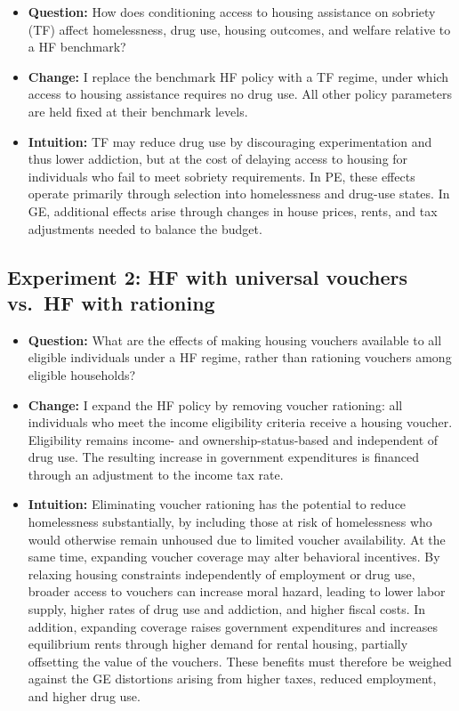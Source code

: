 \documentclass[parskip=full]{article}
\theoremstyle{plain}
\theoremstyle{definition}
\theoremstyle{remark}
\begin{document}
\begin{itemize}
\item \textbf{Question:} How does conditioning access to housing assistance on sobriety (TF) affect homelessness, drug use, housing outcomes, and welfare relative to a HF benchmark?

\item \textbf{Change:} I replace the benchmark HF policy with a TF regime, under which access to housing assistance requires no drug use. All other policy parameters are held fixed at their benchmark levels.

\item \textbf{Intuition:} TF may reduce drug use by discouraging experimentation and thus lower addiction, but at the cost of delaying access to housing for individuals who fail to meet sobriety requirements. In PE, these effects operate primarily through selection into homelessness and drug-use states. In GE, additional effects arise through changes in house prices, rents, and tax adjustments needed to balance the budget.
\end{itemize}

\subsection{Experiment 2: HF with universal vouchers vs.\ HF with rationing}

\begin{itemize}
\item \textbf{Question:} What are the effects of making housing vouchers available to all eligible individuals under a HF regime, rather than rationing vouchers among eligible households?

\item \textbf{Change:} I expand the HF policy by removing voucher rationing: all individuals who meet the income eligibility criteria receive a housing voucher. Eligibility remains income- and ownership-status-based and independent of drug use. The resulting increase in government expenditures is financed through an adjustment to the income tax rate.

\item \textbf{Intuition:} Eliminating voucher rationing has the potential to reduce homelessness substantially, by including those at risk of homelessness who would otherwise remain unhoused due to limited voucher availability. At the same time, expanding voucher coverage may alter behavioral incentives. By relaxing housing constraints independently of employment or drug use, broader access to vouchers can increase moral hazard, leading to lower labor supply, higher rates of drug use and addiction, and higher fiscal costs. In addition, expanding coverage raises government expenditures and increases equilibrium rents through higher demand for rental housing, partially offsetting the value of the vouchers. These benefits must therefore be weighed against the GE distortions arising from higher taxes, reduced employment, and higher drug use.
\end{itemize}
\end{document}
